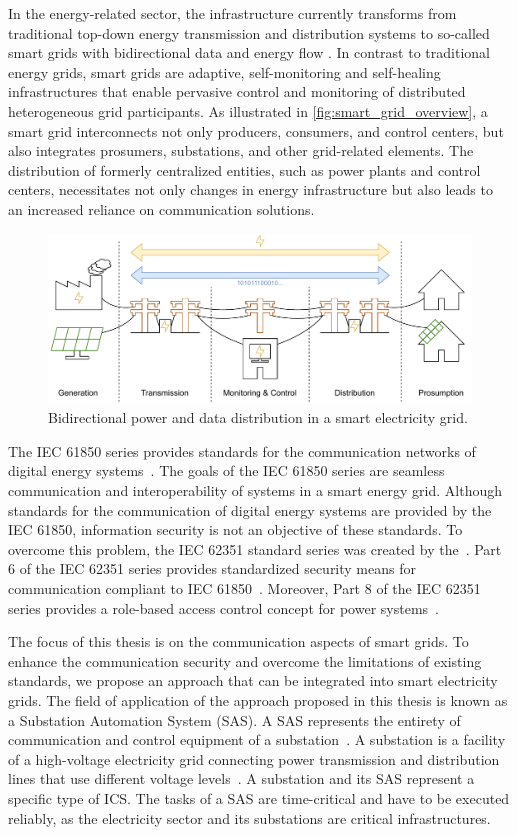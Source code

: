 In the energy-related sector, the infrastructure currently transforms from traditional top-down energy transmission and distribution systems to so-called smart grids with bidirectional data and energy flow \cite{Fang2012}.
In contrast to traditional energy grids, smart grids are adaptive, self-monitoring and self-healing infrastructures that enable pervasive control and monitoring of distributed heterogeneous grid participants.
As illustrated in \autoref{fig:smart_grid_overview}, a smart grid interconnects not only producers, consumers, and control centers, but also integrates prosumers, substations, and other grid-related elements.
The distribution of formerly centralized entities, such as power plants and control centers, necessitates not only changes in energy infrastructure but also leads to an increased reliance on communication solutions.
\begin{figure}
    \centering
    \includegraphics[width=.9\linewidth]{figures/smart_grid_overview_extended_color.drawio.pdf}
    \caption{Bidirectional power and data distribution in a smart electricity grid.}
    \label{fig:smart_grid_overview}
\end{figure}

The IEC 61850 series provides standards for the communication networks of digital energy systems~\cite{IEC61850P5}.
The goals of the IEC 61850 series are seamless communication and interoperability of systems in a smart energy grid.
Although standards for the communication of digital energy systems are provided by the IEC 61850, information security is not an objective of these standards.
To overcome this problem, the IEC 62351 standard series was created by the~\citeauthor{IEC62351P6}.
Part 6 of the IEC 62351 series provides standardized security means for communication compliant to IEC 61850~\cite{IEC62351P6}.
Moreover, Part 8 of the IEC 62351 series provides a role-based access control concept for power systems~\cite{IEC62351P8}.

The focus of this thesis is on the communication aspects of smart grids.
To enhance the communication security and overcome the limitations of existing standards, we propose an approach that can be integrated into smart electricity grids.
The field of application of the approach proposed in this thesis is known as a Substation Automation System (SAS).
A SAS represents the entirety of communication and control equipment of a substation~\cite{Padilla2015}.
A substation is a facility of a high-voltage electricity grid connecting power transmission and distribution lines that use different voltage levels~\cite{oshaSubstation}.
A substation and its SAS represent a specific type of ICS.
The tasks of a SAS are time-critical and have to be executed reliably, as the electricity sector and its substations are critical infrastructures.

